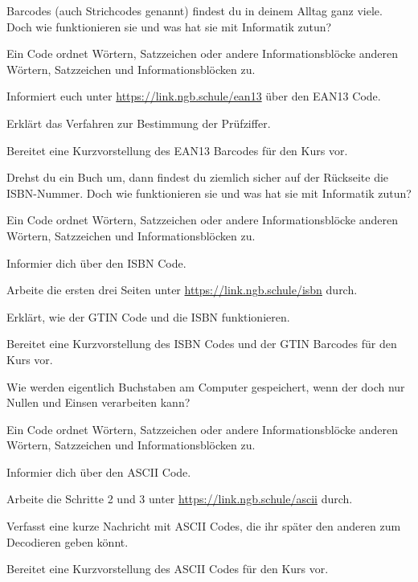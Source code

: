 \documentclass[10pt, a5paper, landscape, ngerman]{arbeitsblatt}
\begin{document}
\newpage
{}

Barcodes (auch Strichcodes genannt) findest du in deinem Alltag ganz viele. Doch wie funktionieren sie und was hat sie mit Informatik zutun?

Ein Code ordnet Wörtern, Satzzeichen oder andere Informationsblöcke anderen Wörtern, Satzzeichen und Informationsblöcken zu.
\begin{enumn}
	\item Informiert euch unter \url{https://link.ngb.schule/ean13} über den EAN13 Code.
	\item Erklärt das Verfahren zur Bestimmung der Prüfziffer.
	\item Bereitet eine Kurzvorstellung des EAN13 Barcodes für den Kurs vor.
\end{enumn}

\newpage
{}

Drehst du ein Buch um, dann findest du ziemlich sicher auf der Rückseite die ISBN-Nummer. Doch wie funktionieren sie und was hat sie mit Informatik zutun?

Ein Code ordnet Wörtern, Satzzeichen oder andere Informationsblöcke anderen Wörtern, Satzzeichen und Informationsblöcken zu.
\begin{enumn}
	\item Informier dich über den ISBN Code.
	\item Arbeite die ersten drei Seiten unter \url{https://link.ngb.schule/isbn} durch.
	\item Erklärt, wie der GTIN Code und die ISBN funktionieren.
	\item Bereitet eine Kurzvorstellung des ISBN Codes und der GTIN Barcodes für den Kurs vor.
\end{enumn}

\newpage
{}

Wie werden eigentlich Buchstaben am Computer gespeichert, wenn der doch nur Nullen und Einsen verarbeiten kann?

Ein Code ordnet Wörtern, Satzzeichen oder andere Informationsblöcke anderen Wörtern, Satzzeichen und Informationsblöcken zu.
\begin{enumn}
	\item Informier dich über den ASCII Code.
	\item Arbeite die Schritte 2 und 3 unter \url{https://link.ngb.schule/ascii} durch.
	\item Verfasst eine kurze Nachricht mit ASCII Codes, die ihr später den anderen zum Decodieren geben könnt.
	\item Bereitet eine Kurzvorstellung des ASCII Codes für den Kurs vor.
\end{enumn}
\end{document}
